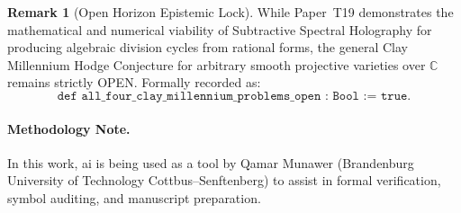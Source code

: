 \documentclass[11pt,a4paper]{article}
\theoremstyle{definition}
\newtheorem{remark}[theorem]{Remark}
\begin{document}
\begin{remark}[Open Horizon Epistemic Lock]
While Paper~T19 demonstrates the mathematical and numerical viability of Subtractive Spectral Holography for producing algebraic division cycles from rational forms, the general Clay Millennium Hodge Conjecture for arbitrary smooth projective varieties over $\mathbb{C}$ remains strictly OPEN. Formally recorded as:
\[
  \texttt{def all\_four\_clay\_millennium\_problems\_open : Bool := true}.
\]
\end{remark}

\paragraph{Methodology Note.}
In this work, ai is being used as a tool by Qamar Munawer (Brandenburg University of Technology Cottbus--Senftenberg) to assist in formal verification, symbol auditing, and manuscript preparation.
\end{document}

